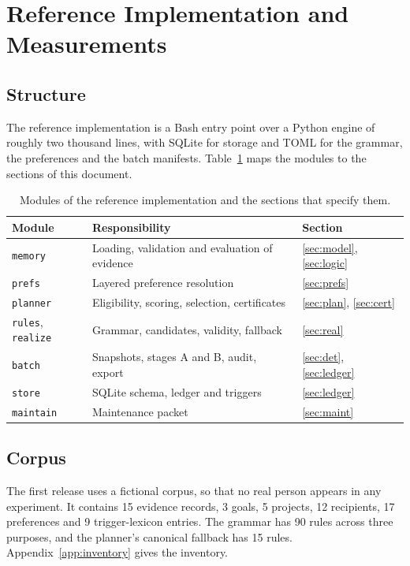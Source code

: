 \documentclass[11pt]{article}
\theoremstyle{definition}
\theoremstyle{remark}
\newcommand{\code}[1]{\texttt{#1}}
\begin{document}
\section{Reference Implementation and Measurements}\label{sec:impl}

\subsection{Structure}

The reference implementation is a Bash entry point over a Python engine of roughly two thousand lines, with SQLite for storage and TOML for the grammar, the preferences and the batch manifests. Table~\ref{tab:modules} maps the modules to the sections of this document.

\begin{table}[H]
\centering
\caption{Modules of the reference implementation and the sections that specify them.}\label{tab:modules}
\begin{tabular}{lll}
\toprule
Module & Responsibility & Section\\
\midrule
\code{memory} & Loading, validation and evaluation of evidence & \ref{sec:model}, \ref{sec:logic}\\
\code{prefs} & Layered preference resolution & \ref{sec:prefs}\\
\code{planner} & Eligibility, scoring, selection, certificates & \ref{sec:plan}, \ref{sec:cert}\\
\code{rules}, \code{realize} & Grammar, candidates, validity, fallback & \ref{sec:real}\\
\code{batch} & Snapshots, stages A and B, audit, export & \ref{sec:det}, \ref{sec:ledger}\\
\code{store} & SQLite schema, ledger and triggers & \ref{sec:ledger}\\
\code{maintain} & Maintenance packet & \ref{sec:maint}\\
\bottomrule
\end{tabular}
\end{table}

\subsection{Corpus}

The first release uses a fictional corpus, so that no real person appears in any experiment. It contains 15 evidence records, 3 goals, 5 projects, 12 recipients, 17 preferences and 9 trigger-lexicon entries. The grammar has 90 rules across three purposes, and the planner's canonical fallback has 15 rules. Appendix~\ref{app:inventory} gives the inventory.
\end{document}
